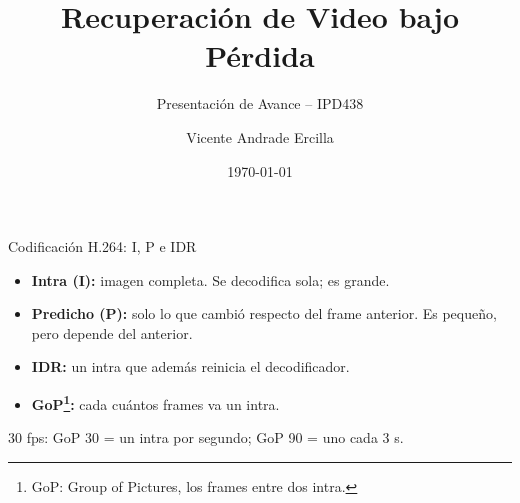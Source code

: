 \documentclass[aspectratio=169, 12pt]{beamer}
\title{\textbf{Recuperación de Video bajo Pérdida}}
\subtitle{Presentación de Avance -- IPD438}
\author{Vicente Andrade Ercilla}
\institute{Universidad Técnica Federico Santa María}
\date{\today}
\newcommand{\secuencia}[5]{%
  \node[anchor=east, font=\scriptsize] at (-0.2, #1+0.17) {#5};
  \pgfmathtruncatemacro{\proxI}{#4 < 0 ? -1 : (floor(#4/#2)+1)*#2}%
  \pgfmathtruncatemacro{\proxH}{#4 < 0 ? -1 : (#3 == 1 ? min((floor(#4/6)+1)*6, \proxI) : \proxI)}%
  \foreach \i in {0,...,90}{%
    \pgfmathtruncatemacro{\esI}{mod(\i,#2) == 0 ? 1 : 0}%
    \pgfmathtruncatemacro{\estado}{\esI == 1 ? 1 : ((#4 >= 0 && \i >= #4 && \i < \proxH) ? 2 : ((#4 >= 0 && \i >= \proxH && \i < \proxI) ? 3 : 0))}%
    \ifcase\estado \def\col{Suave}\or \def\col{SentricaBlue}\or \def\col{Rojo}\or \def\col{Rojo!25}\fi
    \fill[\col] (\i*0.115, #1) rectangle ++(0.1, 0.34);
  }%
  \ifnum#3=1
    \foreach \k in {6,12,...,90}{%
      \pgfmathtruncatemacro{\esI}{mod(\k,#2) == 0 ? 1 : 0}%
      \ifnum\esI=0 \fill[SentricaBlue] (\k*0.115+0.05, #1+0.42) circle (0.04);\fi
    }%
  \fi
  \ifnum#4>-1 \node[font=\tiny] at (#4*0.115+0.05, #1+0.5) {$\blacktriangledown$};\fi
}
\newcommand{\ejetiempo}[1]{%
  \foreach \s/\f in {0/0, 1/30, 2/60, 3/90}{\node[font=\tiny, text=gray] at (\f*0.115+0.05, #1) {\s\,s};}
}
\begin{document}
\begin{frame}
    \titlepage
\end{frame}

\begin{frame}{Codificación H.264: I, P e IDR}
    \begin{itemize}
        \item \textbf{Intra (I):} imagen completa. Se decodifica sola; es grande.
        \item \textbf{Predicho (P):} solo lo que cambió respecto del frame anterior. Es pequeño, pero depende del anterior.
        \item \textbf{IDR:} un intra que además reinicia el decodificador.
        \item \textbf{GoP\footnote{GoP: Group of Pictures, los frames entre dos intra.}:} cada cuántos frames va un intra.
    \end{itemize}

    \vspace{0.3cm}
    \centering

    {\scriptsize 30 fps: GoP 30 = un intra por segundo; GoP 90 = uno cada 3 s.}
\end{frame}
\end{document}
